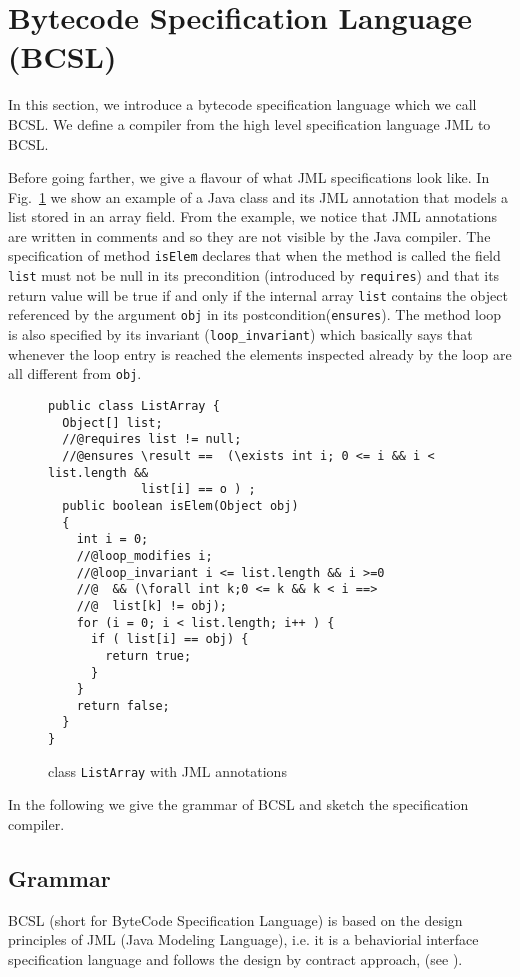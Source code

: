 
\section{Bytecode Specification Language (BCSL)}\label{bcSpecLg}

In this section, we introduce a bytecode specification language which we call BCSL. 
We define a compiler from the high level specification language JML to BCSL. 

Before going farther, we give a flavour of what JML specifications look like. In Fig.~\ref{replaceSrc} we show an example of a Java class and its 
JML annotation that models a list stored in an array field. 
From the example, we notice that JML annotations are written in comments and so they are not visible by the Java compiler.
The specification of method \verb!isElem! declares
 that when the method is called the field \verb!list! must not be null in its precondition (introduced by \verb!requires!) and that its return value will be true if and only if the internal array 
\verb!list! contains the object referenced by the argument \verb!obj! in its postcondition(\verb!ensures!). The method loop is also specified by
its invariant (\verb!loop_invariant!) which basically says that whenever the loop entry is reached the elements inspected already by the loop are all different from \verb!obj!.

 
\begin{figure}[!h]
\begin{verbatim}
public class ListArray {
  Object[] list;
  //@requires list != null;
  //@ensures \result ==  (\exists int i; 0 <= i && i < list.length &&  
             list[i] == o ) ; 
  public boolean isElem(Object obj)
  {
    int i = 0;
    //@loop_modifies i;
    //@loop_invariant i <= list.length && i >=0 
    //@  && (\forall int k;0 <= k && k < i ==> 
    //@  list[k] != obj); 
    for (i = 0; i < list.length; i++ ) {
      if ( list[i] == obj) {
        return true;	
      }
    }
    return false;
  }
}
\end{verbatim}
\caption{class \texttt{ListArray} with JML annotations} 
\label{replaceSrc}
\end{figure}


 In the following we give the grammar of BCSL and sketch the specification compiler.
\subsection{Grammar} \label{grammar}
BCSL (short for ByteCode Specification Language) is based on the design principles of JML (Java Modeling Language), i.e. it is a behaviorial interface specification language and follows the design by contract approach, (see \cite{M97oos}).


